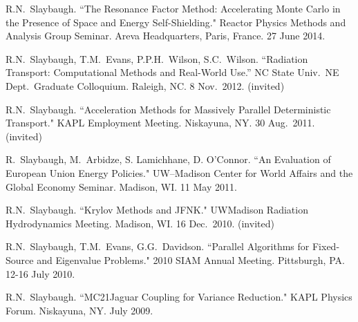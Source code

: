 \begin{bibsection}
\item R.N.\ Slaybaugh. ``The Resonance Factor Method: Accelerating Monte Carlo in the Presence of Space and Energy Self-Shielding." Reactor Physics Methods and Analysis Group Seminar. Areva Headquarters, Paris, France. 27 June 2014.


\item R.N.\ Slaybaugh, T.M.\ Evans, P.P.H.\ Wilson, S.C.\ Wilson. ``Radiation Transport: Computational Methods and Real-World Use.'' NC State Univ.\ NE Dept.\ Graduate Colloquium. Raleigh, NC. 8 Nov.\ 2012. (invited)

\item R.N.\ Slaybaugh. ``Acceleration Methods for Massively Parallel Deterministic Transport." KAPL Employment Meeting. Niskayuna, NY. 30 Aug.\ 2011. (invited)

\item R.\ Slaybaugh, M.\ Arbidze, S. Lamichhane, D. O'Connor. ``An Evaluation of European Union Energy Policies." UW--Madison Center for World Affairs and the Global Economy Seminar. Madison, WI. 11 May 2011.

\item R.N.\ Slaybaugh. ``Krylov Methods and JFNK." UW\textemdash Madison Radiation Hydrodynamics Meeting. Madison, WI. 16 Dec.\ 2010. (invited)

\item R.N.\ Slaybaugh, T.M.\ Evans, G.G.\ Davidson. ``Parallel Algorithms for Fixed-Source and Eigenvalue Problems." 2010 SIAM Annual Meeting. Pittsburgh, PA. 12-16 July 2010.


\item R.N.\ Slaybaugh. ``MC21\textemdash Jaguar Coupling for Variance Reduction." KAPL Physics Forum. Niskayuna, NY. July 2009.

\end{bibsection}


